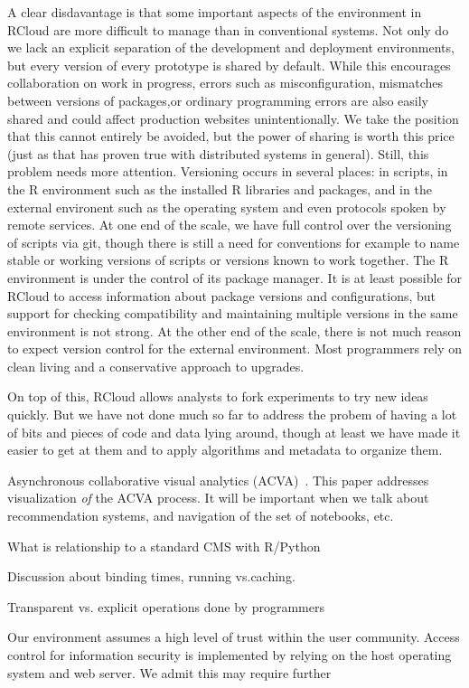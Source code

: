 A clear disdavantage is that some important aspects of the environment in
RCloud are more difficult to manage than in conventional systems. Not only
do we lack an explicit separation of the development and deployment
environments, but every version of every prototype is shared by default.
While this encourages collaboration on work in progress, errors such as
misconfiguration, mismatches between versions of packages,or ordinary
programming errors are also easily shared and could affect production
websites unintentionally. We take the position that this cannot entirely
be avoided, but the power of sharing is worth this price (just as that
has proven true with distributed systems in general). Still, this 
problem needs more attention. 
Versioning occurs in several places: in scripts, in the R environment
such as the installed R libraries and packages, and in the external
environent such as the operating system and even protocols spoken by
remote services. At one end of the scale, we have full control over the
versioning of scripts via git, though there is still a need for conventions
for example to name stable or working versions of scripts or versions known
to work together. The R environment is under the control of its package
manager. It is at least possible for RCloud to access information about
package versions and configurations, but support for checking compatibility
and maintaining multiple versions in the same environment is not strong.
At the other end of the scale, there is not much reason to expect version
control for the external environment. Most programmers rely on clean living
and a conservative approach to upgrades.

On top of this, RCloud allows analysts to fork experiments to try
new ideas quickly. But we have not done much so far to address the
probem of having a lot of bits and pieces of code and data lying
around, though at least we have made it easier to get at them and
to apply algorithms and metadata to organize them.

Asynchronous collaborative visual analytics
(ACVA)~\cite{Chen:2011:SEC}. This paper addresses visualization
\emph{of} the ACVA process. It will be important when we talk about
recommendation systems, and navigation of the set of notebooks, etc.

What is relationship to a standard CMS with R/Python

Discussion about binding times, running vs.caching.

Transparent vs. explicit operations done by programmers

Our environment assumes a high level of trust within the user community.
Access control for information security is implemented by relying on the
host operating system and web server. We admit this may require further 
